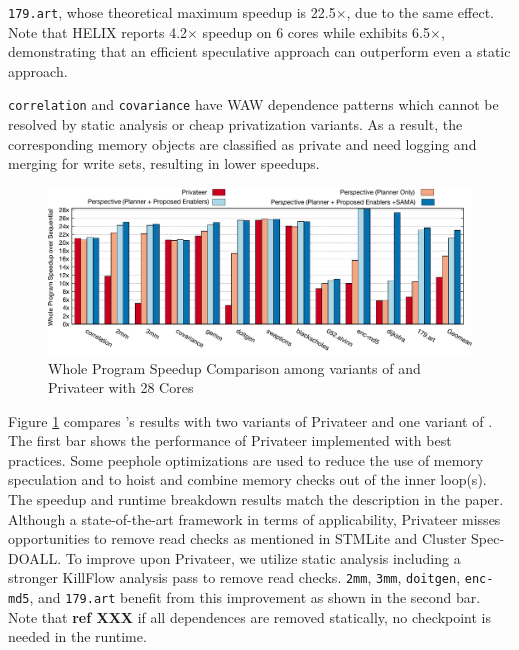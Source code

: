\texttt{179.art}, whose theoretical maximum speedup is 22.5$\times$, due to
the same effect. Note that HELIX\cite{simone:12:cgo} reports 4.2$\times$ speedup
on 6 cores while \name exhibits 6.5$\times$, demonstrating that an efficient
speculative approach can outperform even a static approach.

\texttt{correlation} and \texttt{covariance} have WAW
dependence patterns which cannot be resolved by static analysis or cheap
privatization variants. As a result, the corresponding memory objects are
classified as private and need logging and merging for write sets,
resulting in lower speedups.

\begin{figure}[ht]
  \includegraphics[width=\textwidth]{figures/compare-privateer}
  \caption{Whole Program Speedup Comparison among variants of \name and Privateer with 28 Cores}
  \label{fig:speedup-compare}
\end{figure}

Figure \ref{fig:speedup-compare} compares \namensp's results
 with two
variants of Privateer and one variant of \namensp. The first bar shows the
performance of Privateer implemented with best practices.
Some peephole optimizations are used to reduce the use of memory
speculation and to hoist and combine memory checks out of the inner loop(s).
The speedup and runtime breakdown results match the description in the paper.
Although a state-of-the-art framework in terms of applicability, Privateer
misses opportunities to remove read checks as mentioned in
STMLite\cite{mehrara:09:stmlite} and Cluster Spec-DOALL\cite{kim:12:cgo}. To
improve upon Privateer, we utilize static analysis
including a stronger KillFlow analysis pass to remove read checks.
\texttt{2mm}, \texttt{3mm}, \texttt{doitgen}, \texttt{enc-md5}, and
\texttt{179.art} benefit from this improvement as shown in the second bar.
Note that \textbf{ref XXX} if all dependences are removed statically, no
checkpoint is needed in the runtime.

